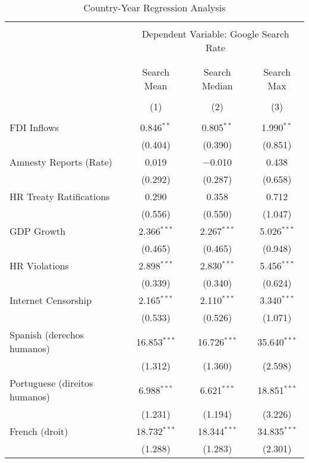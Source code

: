 
\begin{table}[!htbp] \centering 
  \caption{Country-Year Regression Analysis} 
  \label{} 
\begin{tabular}{@{\extracolsep{5pt}}lccc} 
\\[-1.8ex]\hline 
\hline \\[-1.8ex] 
 & \multicolumn{3}{c}{Dependent Variable: Google Search Rate} \\ 
\cline{2-4} 
\\[-1.8ex] & \multicolumn{3}{c}{ } \\ 
 & Search Mean & Search Median & Search Max \\ 
\\[-1.8ex] & (1) & (2) & (3)\\ 
\hline \\[-1.8ex] 
 FDI Inflows & 0.846$^{**}$ & 0.805$^{**}$ & 1.990$^{**}$ \\ 
  & (0.404) & (0.390) & (0.851) \\ 
  Amnesty Reports (Rate) & 0.019 & $-$0.010 & 0.438 \\ 
  & (0.292) & (0.287) & (0.658) \\ 
  HR Treaty Ratifications & 0.290 & 0.358 & 0.712 \\ 
  & (0.556) & (0.550) & (1.047) \\ 
  GDP Growth & 2.366$^{***}$ & 2.267$^{***}$ & 5.026$^{***}$ \\ 
  & (0.465) & (0.465) & (0.948) \\ 
  HR Violations & 2.898$^{***}$ & 2.830$^{***}$ & 5.456$^{***}$ \\ 
  & (0.339) & (0.340) & (0.624) \\ 
  Internet Censorship & 2.165$^{***}$ & 2.110$^{***}$ & 3.340$^{***}$ \\ 
  & (0.533) & (0.526) & (1.071) \\ 
  Spanish (derechos humanos) & 16.853$^{***}$ & 16.726$^{***}$ & 35.640$^{***}$ \\ 
  & (1.312) & (1.360) & (2.598) \\ 
  Portuguese (direitos humanos) & 6.988$^{***}$ & 6.621$^{***}$ & 18.851$^{***}$ \\ 
  & (1.231) & (1.194) & (3.226) \\ 
  French (droit) & 18.732$^{***}$ & 18.344$^{***}$ & 34.835$^{***}$ \\ 
  & (1.288) & (1.283) & (2.301) \\ 

\end{tabular}
\end{table}
